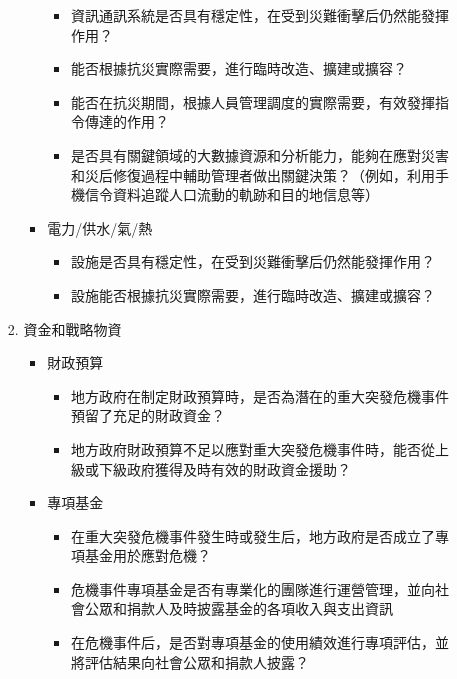 \documentclass[a4paper,12pt]{article}
\begin{document}
\begin{enumerate}
\begin{enumerate}
\begin{enumerate}
\begin{itemize}
\label{sec:orgb43d7c9}
\begin{itemize}
\item 資訊通訊系統是否具有穩定性，在受到災難衝擊后仍然能發揮作用？\\
\item 能否根據抗災實際需要，進行臨時改造、擴建或擴容？\\
\item 能否在抗災期間，根據人員管理調度的實際需要，有效發揮指令傳達的作用？\\
\item 是否具有關鍵領域的大數據資源和分析能力，能夠在應對災害和災后修復過程中輔助管理者做出關鍵決策？（例如，利用手機信令資料追蹤人口流動的軌跡和目的地信息等）\\
\end{itemize}
\item 電力/供水/氣/熱
\label{sec:orgb6fea57}
\begin{itemize}
\item 設施是否具有穩定性，在受到災難衝擊后仍然能發揮作用？\\
\item 設施能否根據抗災實際需要，進行臨時改造、擴建或擴容？\\
\end{itemize}
\end{itemize}
\item 資金和戰略物資
\label{sec:orgbbe8137}
\begin{itemize}
\item 財政預算
\label{sec:org7f6c22c}
\begin{itemize}
\item 地方政府在制定財政預算時，是否為潛在的重大突發危機事件預留了充足的財政資金？\\
\item 地方政府財政預算不足以應對重大突發危機事件時，能否從上級或下級政府獲得及時有效的財政資金援助？\\
\end{itemize}
\item 專項基金
\label{sec:org0a4fc1d}
\begin{itemize}
\item 在重大突發危機事件發生時或發生后，地方政府是否成立了專項基金用於應對危機？\\
\item 危機事件專項基金是否有專業化的團隊進行運營管理，並向社會公眾和捐款人及時披露基金的各項收入與支出資訊\\
\item 在危機事件后，是否對專項基金的使用績效進行專項評估，並將評估結果向社會公眾和捐款人披露？\\

\end{itemize}
\end{itemize}
\end{enumerate}
\end{enumerate}
\end{enumerate}
\end{document}
